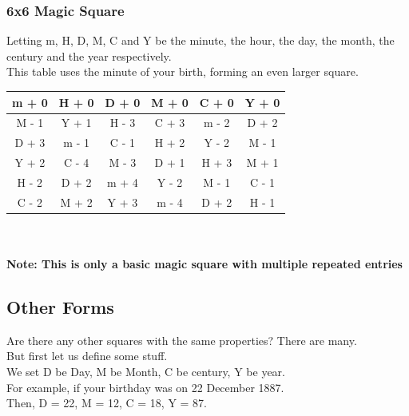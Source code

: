 \documentclass{article}
\begin{document}
    \subsubsection{6x6 Magic Square}
        Letting m, H, D, M, C and Y be the minute, the hour, the day, the month, the century and the year respectively. \\
        This table uses the minute of your birth, forming an even larger square. \\
        \def\arraystretch{2}
        \begin{center}
            \begin{tabular}{|c|c|c|c|c|c|}
                \hline
                 m + 0 & H + 0 & D + 0 & M + 0 & C + 0 & Y + 0  \\
                 \hline
                 M - 1 & Y + 1 & H - 3 & C + 3 & m - 2 & D + 2\\
                 \hline
                 D + 3 & m - 1 & C - 1 & H + 2 & Y - 2 & M - 1\\
                 \hline
                 Y + 2 & C - 4 & M - 3 & D + 1 & H + 3 & M + 1\\
                 \hline
                 H - 2 & D + 2 & m + 4 & Y - 2 & M - 1 & C - 1 \\
                 \hline
                 C - 2 & M + 2 & Y + 3 & m - 4 & D + 2 & H - 1 \\
                 \hline
            \end{tabular} \\
        \textbf{\\ Note: This is only a basic magic square with multiple repeated entries}
        \end{center}
        
\subsection{Other Forms}
Are there any other squares with the same properties?
There are many.\\
But first let us define some stuff.\\
We set D be Day, M be Month, C be century, Y be year. \\
For example, if your birthday was on 22 December 1887.\\ 
Then, D = 22, M = 12, C = 18, Y = 87.\\
\end{document}
